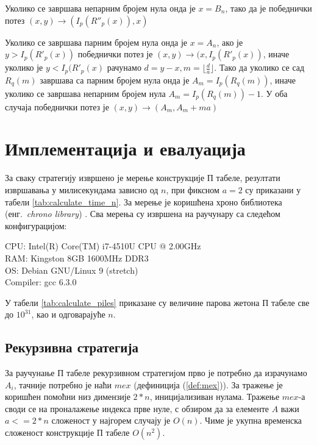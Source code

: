 \documentclass[a4paper]{article}
\begin{document}
Уколико се завршава непарним бројем нула онда је $ x = B_{n} $, тако да је победнички потез $ (x, y) \rightarrow (I_{p}(R''_{p}(x)), x) $

Уколико се завршава парним бројем нула онда је $ x = A_{n} $, ако је $ y > I_{p}(R'_{p}(x)) $ победнички потез је $ (x, y) \rightarrow (x, I_{p}(R'_{p}(x)) $, иначе уколико је $ y < I_{p}(R'_{p}(x) $ рачунамо $ d = y - x, m = \lfloor \frac{d}{a} \rfloor $. Тако да уколико се сад $ R_{q}(m) $ завршава са парним бројем нула онда је $ A_{m} = I_{p}(R_{q}(m)) $, иначе уколико се завршава непарним бројем нула $ A_{m} = I_{p}(R_{q}(m)) - 1 $. У оба случаја победнички потез је $ (x, y) \rightarrow (A_{m}, A_{m} + ma) $

\section{Имплементација и евалуација}
\label{implementacija_evaluacija}

За сваку стратегију извршено је мерење конструкције П табеле, резултати извршавања у милисекундама зависно од $ n $, при фиксном $ a = 2 $ су приказани у табели \ref{tab:calculate_time_n}. 
За мерење је коришћена хроно библиотека (енг.{~\em chrono library}) \cite{chrono_library}. Сва мерења су извршена на раучунару са следећом конфигурацијом:
\begin{flushleft}
	CPU: Intel(R) Core(TM) i7-4510U CPU @ 2.00GHz\\
	RAM: Kingston 8GB 1600MHz DDR3\\
	OS: Debian GNU/Linux 9 (stretch)\\
	Compiler: gcc 6.3.0\\
\end{flushleft}

У табели \ref{tab:calculate_piles} приказане су величине парова жетона П табеле све до $ 10^{31} $, као и одговарајуће $ n $.

\subsection{Рекурзивна стратегија}

За раучунање П табеле рекурзивном стратегијом прво је потребно да израчунамо $ A_{i} $, тачније потребно је наћи $ mex $ (дефиниција (\ref{def:mex})). За тражење је коришћен помоћни низ димензије $ 2*n $, иницијализиван нулама. Тражење $ mex $-а  своди се на проналажење индекса прве нуле, с обзиром да за елементе $ A $ важи $ a <= 2*n $ сложеност у најгорем случају је $ O(n) $. Чиме је укупна временска сложеност конструкције П табеле $ O(n^2) $.\\
\end{document}
